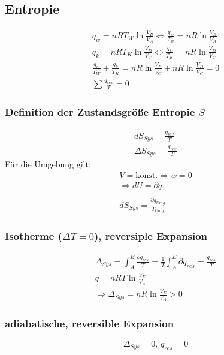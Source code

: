 \documentclass[a4paper, fleqn]{article}
\begin{document}
\subsection{Entropie}
\begin{eqnarray*}
    q_w=nRT_W\ln\frac{V_B}{V_A} \Leftrightarrow \frac{q_w}{T_w}=nR\ln\frac{V_B}{V_A}\\
    q_k = nRT_K\ln\frac{V_D}{V_C} \Leftrightarrow \frac{q_k}{T_K}=nR\ln\frac{V_D}{V_C}\\
    \frac{q_w}{T_W}+\frac{q_k}{T_K}=nR\ln\frac{V_B}{V_C}+nR\ln\frac{V_D}{V_C}=0\\
    \sum \frac{q_{rev}}{T}=0
\end{eqnarray*}

\subsubsection{Definition der Zustandsgröße Entropie $S$}
\begin{eqnarray*}
    dS_{Sys}=\frac{q_{rev}}{T}\\
    \Delta S_{Sys}=\frac{q_{rev}}{T}
\end{eqnarray*}
Für die Umgebung gilt:
\begin{eqnarray*}
    V = \text{konst.} \Rightarrow w = 0\\
    \Rightarrow dU = \partial q\\
    \\
    dS_{Sys} = \frac{\partial q_{Umg}}{T_{Umg}}
\end{eqnarray*}

\subsubsection{Isotherme ($\Delta T=0$), reversiple Expansion}
\begin{eqnarray*}
    \Delta_{Sys}=\int_{A}^{E}\frac{\partial q_{res}}{T} = \frac{1}{T} \int_{A}^{E} \partial q_{res} = \frac{q_{res}}{T}\\
    q = nRT\ln\frac{V_E}{V_A}\\
    \Rightarrow \Delta_{Sys} = nR\ln\frac{V_E}{V_A}>0
\end{eqnarray*}

\subsubsection{adiabatische, reversible Expansion}
\begin{equation*}
    \Delta_{Sys} = 0,\,q_{res}=0
\end{equation*}
\end{document}
